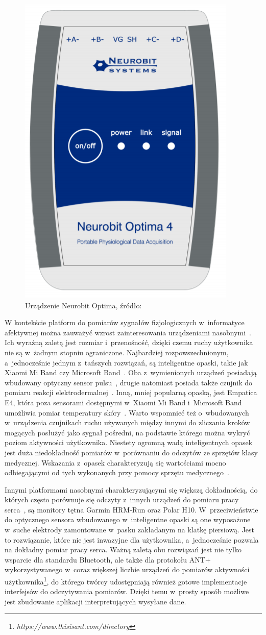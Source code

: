 \begin{figure}
	\centering
	\includegraphics[width=0.3\linewidth]{images/neurobit_optima.png}
	\caption{Urządzenie Neurobit Optima, źródło: \cite{neurobit_manual}}
	\label{fig:neurobit}
\end{figure}

W kontekście platform do pomiarów sygnałów fizjologicznych w~informatyce afektywnej można zauważyć wzrost zainteresowania urządzeniami nasobnymi~\cite{wearable_sensors_2018}. Ich wyraźną zaletą jest rozmiar i~przenośność, dzięki czemu ruchy użytkownika nie są w~żadnym stopniu ograniczone. Najbardziej rozpowszechnionym, a~jednocześnie jednym z~tańszych rozwiązań, są inteligentne opaski, takie jak Xiaomi Mi Band czy Microsoft Band~\cite{wearable_sensors_2018}. Oba z~wymienionych urządzeń posiadają wbudowany optyczny sensor pulsu~\cite{miband_manual,microsoft_band_factsheet}, drugie natomiast posiada także czujnik do pomiaru reakcji elektrodermalnej~\cite{microsoft_band_factsheet}. Inną, mniej popularną opaską, jest Empatica E4, która poza sensorami dostępnymi w~Xiaomi Mi Band i~Microsoft Band umożliwia pomiar temperatury skóry~\cite{empatica_manual}. Warto wspomnieć też o~wbudowanych w~urządzenia czujnikach ruchu używanych między innymi do zliczania kroków mogących posłużyć jako sygnał pośredni, na podstawie którego można wykryć poziom aktywności użytkownika. Niestety ogromną wadą inteligentnych opasek jest duża niedokładność pomiarów w~porównaniu do odczytów ze sprzętów klasy medycznej. Wskazania z~opasek charakteryzują się wartościami mocno odbiegającymi od tych wykonanych przy pomocy sprzętu medycznego~\cite{wearable_sensors_2018,accuracy_of_wearables_hr}.

Innymi platformami nasobnymi charakteryzującymi się większą dokładnością, do których często porównuje się odczyty z~innych urządzeń do pomiaru pracy serca~\cite{wearable_sensors_2018,accuracy_of_wearables_hr}, są monitory tętna Garmin HRM-Run oraz Polar H10. W~przeciwieństwie do optycznego sensora wbudowanego w~inteligentne opaski są one wyposażone w~suche elektrody zamontowane w~pasku zakładanym na klatkę piersiową\cite{polar_manual,garmin_manual}. Jest to rozwiązanie, które nie jest inwazyjne dla użytkownika, a~jednocześnie pozwala na dokładny pomiar pracy serca. Ważną zaletą obu rozwiązań jest nie tylko wsparcie dla standardu Bluetooth, ale także dla protokołu ANT+ wykorzystywanego w~coraz większej liczbie urządzeń do pomiarów aktywności użytkownika\footnote{\textit{https://www.thisisant.com/directory}}, do którego twórcy udostępniają również gotowe implementacje interfejsów do odczytywania pomiarów. Dzięki temu w~prosty sposób możliwe jest zbudowanie aplikacji interpretujących wysyłane dane.

